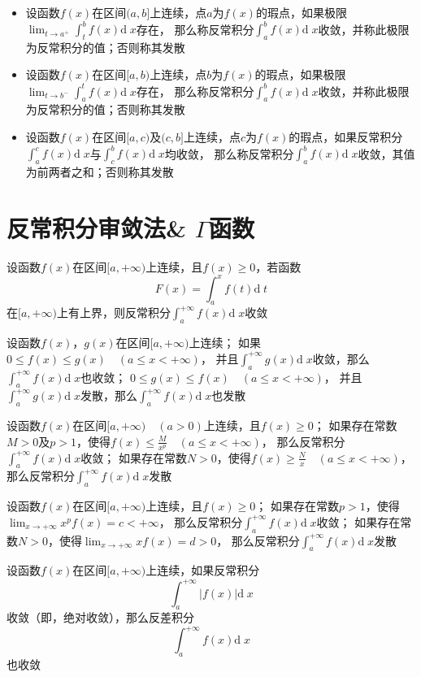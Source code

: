 \documentclass[UTF8]{ctexart}
\newcommand{\dif}[1]{\text{d}\;\!#1}
\begin{document}
\bigskip

\begin{itemize}
  \item 设函数$f(x)$在区间$(a,b]$上连续，点$a$为$f(x)$的瑕点，如果极限$\displaystyle\lim_{t\to a^+}\int_t^bf(x)\dif{x}$存在，
  那么称反常积分$\int_a^bf(x)\dif{x}$收敛，并称此极限为反常积分的值；否则称其发散
  \item 设函数$f(x)$在区间$[a,b)$上连续，点$b$为$f(x)$的瑕点，如果极限$\displaystyle\lim_{t\to b^-}\int_a^tf(x)\dif{x}$存在，
  那么称反常积分$\int_a^bf(x)\dif{x}$收敛，并称此极限为反常积分的值；否则称其发散
  \item 设函数$f(x)$在区间$[a,c)$及$(c,b]$上连续，点$c$为$f(x)$的瑕点，如果反常积分$\int_a^cf(x)\dif{x}$与$\int_c^bf(x)\dif{x}$均收敛，
  那么称反常积分$\int_a^bf(x)\dif{x}$收敛，其值为前两者之和；否则称其发散
\end{itemize}

\bigskip
\bigskip

\section*{反常积分审敛法\& $\Gamma$函数}

\bigskip

设函数$f(x)$在区间$[a,+\infty)$上连续，且$f(x)\ge0$，若函数
\[F(x)=\int_a^xf(t)\dif{t}\]
在$[a,+\infty)$上有上界，则反常积分$\int_a^{+\infty}f(x)\dif{x}$收敛

设函数$f(x)$，$g(x)$在区间$[a,+\infty)$上连续；
如果$0\le f(x)\le g(x)\quad(a\le x<+\infty)$，
并且$\int_a^{+\infty}g(x)\dif{x}$收敛，那么$\int_a^{+\infty}f(x)\dif{x}$也收敛；
$0\le g(x)\le f(x)\quad(a\le x<+\infty)$，
并且$\int_a^{+\infty}g(x)\dif{x}$发散，那么$\int_a^{+\infty}f(x)\dif{x}$也发散

设函数$f(x)$在区间$[a,+\infty)\quad(a>0)$上连续，且$f(x)\ge0$；
如果存在常数$M>0$及$p>1$，使得$f(x)\le\frac{M}{x^p}\quad(a\le x<+\infty)$，
那么反常积分$\int_a^{+\infty}f(x)\dif{x}$收敛；
如果存在常数$N>0$，使得$f(x)\ge\frac{N}{x}\quad(a\le x<+\infty)$，
那么反常积分$\int_a^{+\infty}f(x)\dif{x}$发散

设函数$f(x)$在区间$[a,+\infty)$上连续，且$f(x)\ge0$；
如果存在常数$p>1$，使得$\lim_{x\to+\infty}x^pf(x)=c<+\infty$，
那么反常积分$\int_a^{+\infty}f(x)\dif{x}$收敛；
如果存在常数$N>0$，使得$\lim_{x\to+\infty}xf(x)=d>0$，
那么反常积分$\int_a^{+\infty}f(x)\dif{x}$发散

设函数$f(x)$在区间$[a,+\infty)$上连续，如果反常积分
\[ \int_a^{+\infty}|f(x)|\dif{x} \]
收敛（即，绝对收敛），那么反差积分
\[ \int_a^{+\infty}f(x)\dif{x} \]
也收敛
\end{document}
